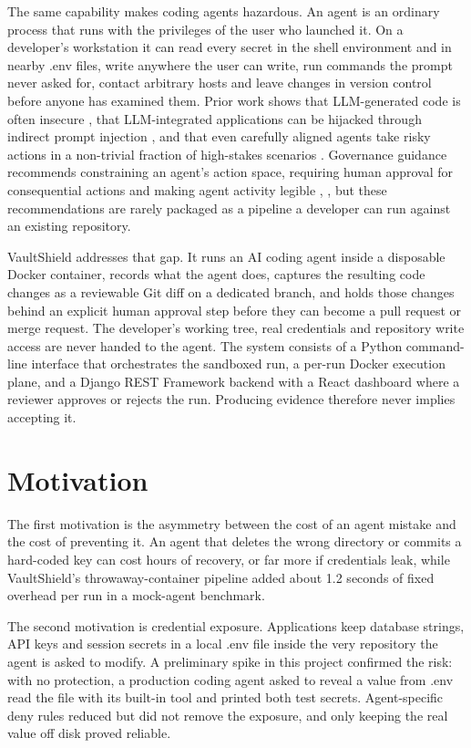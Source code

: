 \documentclass[12pt,a4paper,oneside]{report}
\begin{document}
The same capability makes coding agents hazardous. An agent is an ordinary process that runs with the privileges of the user who launched it. On a developer's workstation it can read every secret in the shell environment and in nearby .env files, write anywhere the user can write, run commands the prompt never asked for, contact arbitrary hosts and leave changes in version control before anyone has examined them. Prior work shows that LLM-generated code is often insecure \cite{ref8}, that LLM-integrated applications can be hijacked through indirect prompt injection \cite{ref7}, and that even carefully aligned agents take risky actions in a non-trivial fraction of high-stakes scenarios \cite{ref5}. Governance guidance recommends constraining an agent's action space, requiring human approval for consequential actions and making agent activity legible \cite{ref9}, \cite{ref10}, but these recommendations are rarely packaged as a pipeline a developer can run against an existing repository.

VaultShield addresses that gap. It runs an AI coding agent inside a disposable Docker container, records what the agent does, captures the resulting code changes as a reviewable Git diff on a dedicated branch, and holds those changes behind an explicit human approval step before they can become a pull request or merge request. The developer's working tree, real credentials and repository write access are never handed to the agent. The system consists of a Python command-line interface that orchestrates the sandboxed run, a per-run Docker execution plane, and a Django REST Framework backend with a React dashboard where a reviewer approves or rejects the run. Producing evidence therefore never implies accepting it.

\section{Motivation}\label{motivation}

The first motivation is the asymmetry between the cost of an agent mistake and the cost of preventing it. An agent that deletes the wrong directory or commits a hard-coded key can cost hours of recovery, or far more if credentials leak, while VaultShield's throwaway-container pipeline added about 1.2 seconds of fixed overhead per run in a mock-agent benchmark.

The second motivation is credential exposure. Applications keep database strings, API keys and session secrets in a local .env file inside the very repository the agent is asked to modify. A preliminary spike in this project confirmed the risk: with no protection, a production coding agent asked to reveal a value from .env read the file with its built-in tool and printed both test secrets. Agent-specific deny rules reduced but did not remove the exposure, and only keeping the real value off disk proved reliable.
\end{document}
